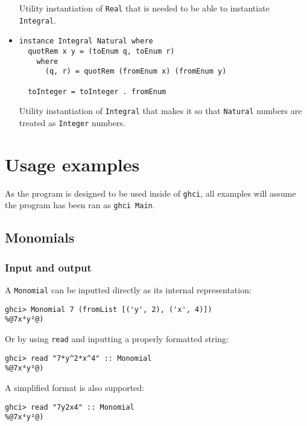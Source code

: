 \documentclass[11pt,a4paper]{article}
\begin{document}
\begin{itemize}
          Utility instantiation of \lstinline{Real} that is needed to be able to instantiate \lstinline{Integral}.

    \item \begin{lstlisting}
instance Integral Natural where
  quotRem x y = (toEnum q, toEnum r)
    where
      (q, r) = quotRem (fromEnum x) (fromEnum y)

  toInteger = toInteger . fromEnum     
    \end{lstlisting}

          Utility instantiation of \lstinline{Integral} that makes it so that \lstinline{Natural} numbers are treated as \lstinline{Integer} numbers.

\end{itemize}

\section{Usage examples}

As the program is designed to be used inside of \lstinline{ghci}, all examples will assume the program has been ran as \lstinline{ghci Main}.

\subsection{Monomials}

\subsubsection{Input and output}

A \lstinline{Monomial} can be inputted directly as its internal representation:

\begin{lstlisting}
ghci> Monomial 7 (fromList [('y', 2), ('x', 4)])
%@7x⁴y²@)
\end{lstlisting}

Or by using \lstinline{read} and inputting a properly formatted string:

\begin{lstlisting}
ghci> read "7*y^2*x^4" :: Monomial
%@7x⁴y²@)
\end{lstlisting}

A simplified format is also supported:

\begin{lstlisting}
ghci> read "7y2x4" :: Monomial
%@7x⁴y²@)
\end{lstlisting}
\end{document}
